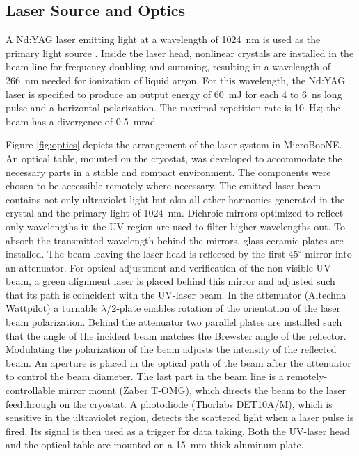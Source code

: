 \subsection{Laser Source and Optics}
A Nd:YAG laser emitting light at a wavelength of 1024~nm is used as the primary light source \cite{continuum}. Inside the laser head, nonlinear crystals are installed in the beam line for frequency doubling and summing, resulting in a wavelength of 266~nm needed for ionization of liquid argon. For this wavelength, the Nd:YAG laser is specified to produce an output energy of 60~mJ for each 4 to 6~ns long pulse and a horizontal polarization. The maximal repetition rate is 10~Hz; the beam has a divergence of 0.5~mrad.

Figure \ref{fig:optics} depicts the arrangement of the laser system in MicroBooNE.  An optical table, mounted on the cryostat, was developed to accommodate the necessary parts in a stable and compact environment. The components were chosen to be accessible remotely where necessary. The emitted laser beam contains not only ultraviolet light but also all other harmonics generated in the crystal and the primary light of 1024~nm. Dichroic mirrors optimized to reflect only wavelengths in the UV region are used to filter higher wavelengths out. To absorb the transmitted wavelength behind the mirrors, glass-ceramic plates are installed. The beam leaving the laser head is reflected by the first $45^{\circ}$-mirror into an attenuator. For optical adjustment and verification of the non-visible UV-beam, a green alignment laser is placed behind this mirror and adjusted such that its path is coincident with the UV-laser beam. In the attenuator (Altechna Wattpilot) a turnable $\lambda/2$-plate enables rotation of the orientation of the laser beam polarization. Behind the attenuator two parallel plates are installed such that the angle of the incident beam matches the Brewster angle of the reflector. Modulating the polarization of the beam adjusts the intensity of the reflected beam. An aperture is placed in the optical path of the beam after the attenuator to control the beam diameter. The last part in the beam line is a remotely-controllable mirror mount (Zaber T-OMG), which directs the beam to the laser feedthrough on the cryostat. A photodiode (Thorlabs DET10A/M), which is sensitive in the ultraviolet region, detects the scattered light when a laser pulse is fired.  Its signal is then used as a trigger for data taking. Both the UV-laser head and the optical table are mounted on a 15~mm thick aluminum plate.

